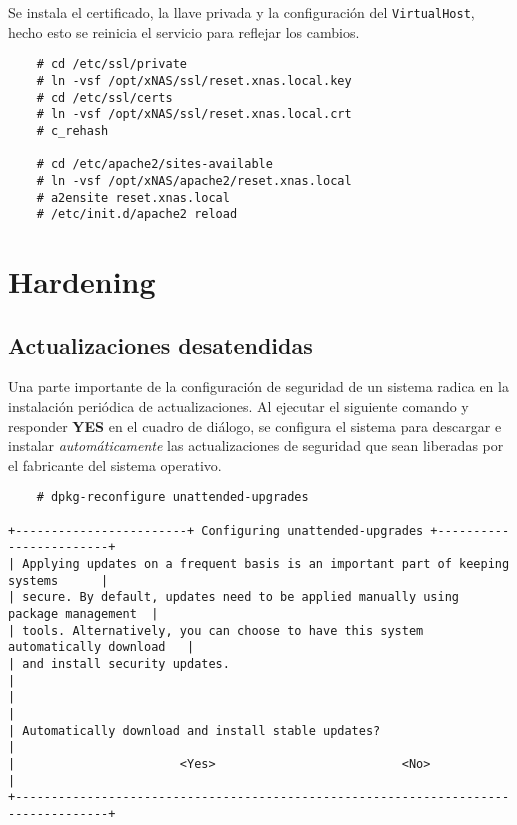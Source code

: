 Se instala el certificado, la llave privada y la configuraci\'{o}n del \texttt{VirtualHost}, hecho esto se reinicia el servicio para reflejar los cambios.

{
\scriptsize
\linespread{1}
\begin{verbatim}
    # cd /etc/ssl/private
    # ln -vsf /opt/xNAS/ssl/reset.xnas.local.key
    # cd /etc/ssl/certs
    # ln -vsf /opt/xNAS/ssl/reset.xnas.local.crt
    # c_rehash

    # cd /etc/apache2/sites-available
    # ln -vsf /opt/xNAS/apache2/reset.xnas.local
    # a2ensite reset.xnas.local
    # /etc/init.d/apache2 reload
\end{verbatim}
}

    \section {Hardening}

      \subsection {Actualizaciones desatendidas}

Una parte importante de la configuraci\'{o}n de seguridad de un sistema radica en la instalaci\'{o}n peri\'{o}dica de actualizaciones. Al ejecutar el siguiente comando y responder \textbf{YES} en el cuadro de di\'{a}logo, se configura el sistema para descargar e instalar \emph{autom\'{a}ticamente} las actualizaciones de seguridad que sean liberadas por el fabricante del sistema operativo.

{
\scriptsize
\linespread{1}
\begin{verbatim}
    # dpkg-reconfigure unattended-upgrades

+------------------------+ Configuring unattended-upgrades +------------------------+
| Applying updates on a frequent basis is an important part of keeping systems      |
| secure. By default, updates need to be applied manually using package management  |
| tools. Alternatively, you can choose to have this system automatically download   |
| and install security updates.                                                     |
|                                                                                   |
| Automatically download and install stable updates?                                |
|                       <Yes>                          <No>                         |
+-----------------------------------------------------------------------------------+
\end{verbatim}
}

